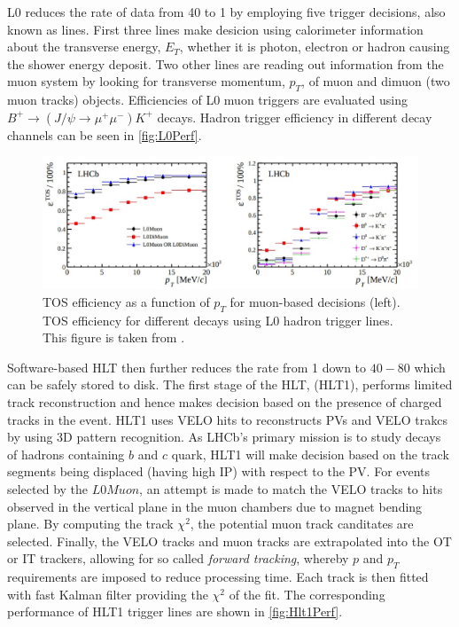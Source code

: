 \Gls{L0} reduces the rate of data from 40 \mhz to 1 \mhz by employing five trigger decisions, also known as lines. First three lines make desicion using calorimeter information about the transverse energy, $E_{T}$, whether it is photon, electron or hadron causing the shower energy deposit. Two other lines are reading out information from the muon system by looking for transverse momentum, $p_{T}$, of muon and dimuon (two muon tracks) objects. Efficiencies of L0 muon triggers are evaluated using $B^{+} \rightarrow (J/\psi \rightarrow \mu^{+} \mu^{-}) K^{+}$ decays. Hadron trigger efficiency in different decay channels can be seen in \autoref{fig:L0Perf}. 


\begin{figure}[!h]
	\centering
	\includegraphics[width = 1.0\textwidth]{figs/detector/L0performance.eps}%
	\caption{ \Gls{TOS} efficiency as a function of $p_{T}$ for muon-based decisions (left).         \Gls{TOS} efficiency for different decays using L0 hadron trigger lines. This figure is taken from \cite{LHCb-DP-2012-002}. }  
	\label{fig:L0Perf}
\end{figure}


Software-based \Gls{HLT} then further reduces the rate from 1 \mhz down to $40-80$ \khz which can be safely stored to disk. The first stage of the \Gls{HLT}, (\Gls{HLT1}), performs limited track reconstruction and hence makes decision based on the presence of charged tracks in the event. \Gls{HLT1} uses \Gls{VELO} hits to reconstructs \Gls{PV}s and \Gls{VELO} trakcs by using 3D pattern recognition. As \Gls{LHCb}'s primary mission is to study decays of hadrons containing $b$ and $c$ quark, \Gls{HLT1} will make decision based on the track segments being displaced (having high \Gls{IP}) with respect to the \Gls{PV}. For events selected by the $L0Muon$, an attempt is made to match the \Gls{VELO} tracks to hits observed in the vertical plane in the muon chambers due to magnet bending plane. By computing the track $\chi^2$, the potential muon track canditates are selected. Finally, the \Gls{VELO} tracks and muon tracks are extrapolated into the \Gls{OT} or \Gls{IT} trackers, allowing for so called \textit{forward tracking}, whereby $p$ and $p_{T}$ requirements are imposed to reduce processing time. Each track is then fitted with fast Kalman filter providing the $\chi^2$ of the fit. The corresponding performance of \Gls{HLT1} trigger lines are shown in \autoref{fig:Hlt1Perf}.


